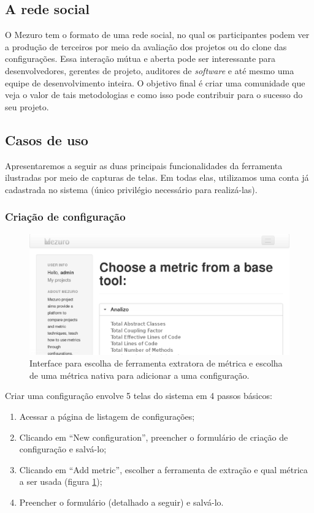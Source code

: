 \documentclass{llncs}
\begin{document}
  \subsection{A rede social}\label{sec:user-potencial}
  O Mezuro tem o formato de uma rede social, no qual os participantes podem ver a produção de terceiros por meio da avaliação dos projetos ou do clone das configurações. Essa interação mútua e aberta pode ser interessante para desenvolvedores, gerentes de projeto, auditores de \textit{software} e até mesmo uma equipe de desenvolvimento inteira. O objetivo final é criar uma comunidade que veja o valor de tais metodologias e como isso pode contribuir para o sucesso do seu projeto.

  \subsection{Casos de uso}
  Apresentaremos a seguir as duas principais funcionalidades da ferramenta ilustradas por meio de capturas de telas. Em todas elas, utilizamos uma conta já cadastrada no sistema (único privilégio necessário para realizá-las).

    \subsubsection{Criação de configuração}
    \begin{figure}[H]
      \centering
      \includegraphics[width=\textwidth]{images/choose-metric.png}
      \caption{Interface para escolha de ferramenta extratora de métrica e escolha de uma métrica nativa para adicionar a uma configuração.}
      \label{fig:choose-metric}
    \end{figure}

    Criar uma configuração envolve 5 telas do sistema em 4 passos básicos:
    \begin{enumerate}
      \item Acessar a página de listagem de configurações;
      \item Clicando em ``New configuration'', preencher o formulário de criação de configuração e salvá-lo;
      \item Clicando em ``Add metric'', escolher a ferramenta de extração e qual métrica a ser usada (figura \ref{fig:choose-metric});
      \item Preencher o formulário (detalhado a seguir) e salvá-lo.
    \end{enumerate}
\end{document}
